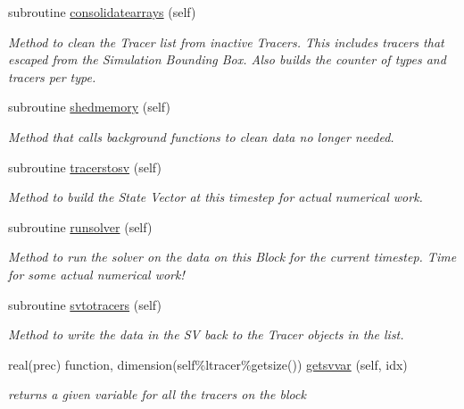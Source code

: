 \begin{DoxyCompactItemize}
subroutine \mbox{\hyperlink{namespaceblocks__mod_a25ff530b5125e4cee5b1f474b2491883}{consolidatearrays}} (self)
\begin{DoxyCompactList}\small\item\em Method to clean the Tracer list from inactive Tracers. This includes tracers that escaped from the Simulation Bounding Box. Also builds the counter of types and tracers per type. \end{DoxyCompactList}\item 
subroutine \mbox{\hyperlink{namespaceblocks__mod_a04a9fab577b0d1fb6cabefcde2b2180d}{shedmemory}} (self)
\begin{DoxyCompactList}\small\item\em Method that calls background functions to clean data no longer needed. \end{DoxyCompactList}\item 
subroutine \mbox{\hyperlink{namespaceblocks__mod_aa9c438503e619aa4352081ff46b15430}{tracerstosv}} (self)
\begin{DoxyCompactList}\small\item\em Method to build the State Vector at this timestep for actual numerical work. \end{DoxyCompactList}\item 
subroutine \mbox{\hyperlink{namespaceblocks__mod_a3245bdadbec6bb123c517921d1503b48}{runsolver}} (self)
\begin{DoxyCompactList}\small\item\em Method to run the solver on the data on this Block for the current timestep. Time for some actual numerical work! \end{DoxyCompactList}\item 
subroutine \mbox{\hyperlink{namespaceblocks__mod_a306a753acc9b8bb9107ebda481162180}{svtotracers}} (self)
\begin{DoxyCompactList}\small\item\em Method to write the data in the SV back to the Tracer objects in the list. \end{DoxyCompactList}\item 
real(prec) function, dimension(self\%ltracer\%getsize()) \mbox{\hyperlink{namespaceblocks__mod_a569c8a4a94791d4c0c24697b351ca8f2}{getsvvar}} (self, idx)
\begin{DoxyCompactList}\small\item\em returns a given variable for all the tracers on the block \end{DoxyCompactList}\item 

\end{DoxyCompactItemize}
